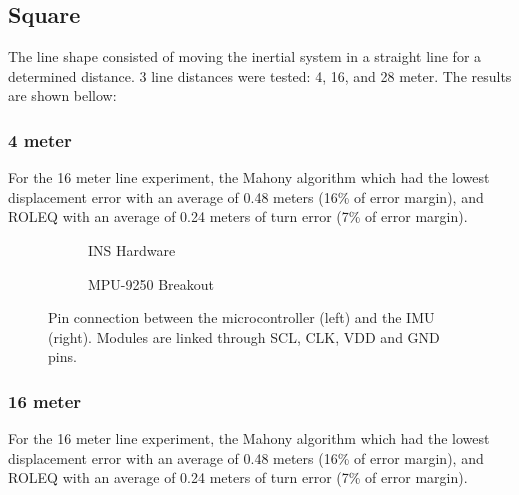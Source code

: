 \subsection{Square}

The line shape consisted of moving the inertial system in a straight line for a determined distance. 3 line distances were tested: 4, 16, and 28 meter. The results are shown bellow:

\subsubsection{4 meter}

For the 16 meter line experiment, the Mahony algorithm which had the lowest displacement error with an average of 0.48 meters (16\% of error margin), and ROLEQ with an average of 0.24 meters of turn error (7\% of error margin).


\begin{figure}[!h]
    \centering
    
\end{figure}

\begin{figure}[!h]
    \centering
    \begin{subfigure}{0.49\textwidth}
        \centering
        \resizebox{1\linewidth}{!}{}
        \caption{INS Hardware}
        \label{fig:square42D}
    \end{subfigure}
    \begin{subfigure}{0.49\textwidth}
        \centering
        \resizebox{1\linewidth}{!}{}
        \caption{MPU-9250 Breakout}
        \label{fig:square43D}
    \end{subfigure}
    \caption{Pin connection between the microcontroller (left) and the IMU (right). Modules are linked through SCL, CLK, VDD and GND pins.}
    \label{fig:square4}
\end{figure}

\subsubsection{16 meter}

For the 16 meter line experiment, the Mahony algorithm which had the lowest displacement error with an average of 0.48 meters (16\% of error margin), and ROLEQ with an average of 0.24 meters of turn error (7\% of error margin).

\begin{figure}[!h]
    \centering
    
\end{figure}

